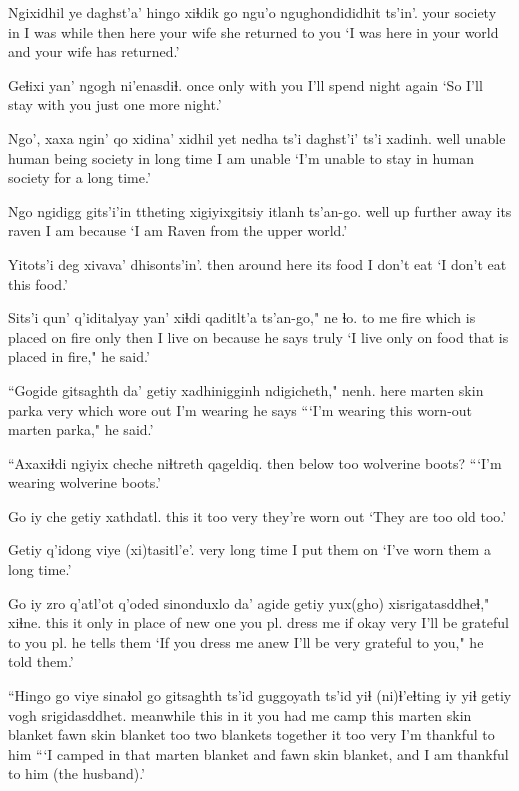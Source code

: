 \documentclass[12pt]{article}
\begin{document}
\gll Ngixidhil ye daghst'a' hingo xiɬdik go ngu'o ngughondididhit ts'in'.
{your society} in {I was} while then here {your wife} {she returned to you} {}
\glt `I was here in your world and your wife has returned.'
\glend

\gll Geɬixi yan' ngogh ni'enasdiɬ.
once only {with you} {I'll spend night again}
\glt `So I'll stay with you just one more night.'
\glend

\gll Ngo', xaxa {ngin' qo xidina'} xidhil yet nedha ts'i daghst'i' ts'i xadinh.
well unable {human being} society in {long time} {} {I am} {} unable
\glt `I'm unable to stay in human society for a long time.' 
\glend

\gll Ngo ngidigg {gits'i'in ttheting} xigiyixgitsiy itlanh ts'an-go.
well up {further away} {its raven} {I am} because
\glt `I am Raven from the upper world.'
\glend

\gll Yitots'i deg xivava' dhisonts'in'.
then {around here} {its food} {I don't eat}
\glt `I don't eat this food.'
\glend

\gll Sits'i qun' q'iditalyay yan' xiɬdi qaditlt'a ts'an-go," ne ɬo.
{to me} fire {which is placed on fire} only then {I live on} because {he says} truly
\glt `I live only on food that is placed in fire," he said.'
\glend

\gll ``Gogide gitsaghth da' getiy xadhinigginh ndigicheth," nenh.
here {marten skin} parka very {which wore out} {I'm wearing} {he says}
\glt ```I'm wearing this worn-out marten parka," he said.'
\glend

\gll ``Axaxiɬdi ngiyix cheche niɬtreth qageldiq.
then below too wolverine boots?
\glt ```I'm wearing wolverine boots.'
\glend

\gll Go iy che getiy xathdatl.
this it too very {they're worn out}
\glt `They are too old too.'
\glend

\gll Getiy q'idong {viye (xi)tasitl'e'.}
very {long time} {I put them on}
\glt `I've worn them a long time.'
\glend

\gll Go iy zro q'atl'ot q'oded sinonduxlo da' agide getiy {yux(gho) xisrigatasddheɬ,"} xiɬne.
this it only {in place of} {new one} {you pl. dress me} if okay very {I'll be grateful to you pl.} {he tells them}
\glt `If you dress me anew I'll be very grateful to you," he told them.'
\glend

\gll ``Hingo go   viye    sinaɬol           go   gitsaghth     ts'id    guggoyath  ts'id   yiɬ (ni)ɬ'eɬting iy yiɬ getiy {vogh srigidasddhet.}
meanwhile    this {in it} {you had me camp} this {marten skin} blanket {fawn skin} blanket too {two blankets together} it too very {I'm thankful to him}
\glt ```I camped in that marten blanket and fawn skin blanket, and I am thankful to him (the husband).'
\glend
\end{document}
